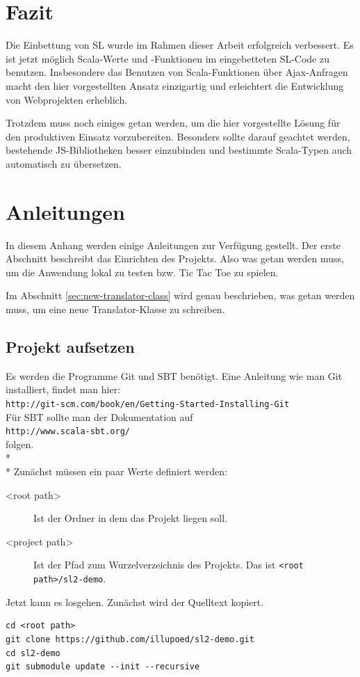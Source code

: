 \documentclass[12pt,bibtotoc]{scrreprt}
\begin{document}
\chapter{Fazit}
\label{chap:conclusion}

Die Einbettung von SL wurde im Rahmen dieser Arbeit erfolgreich verbessert. Es ist jetzt möglich Scala-Werte und -Funktionen im eingebetteten SL-Code zu benutzen. Insbesondere das Benutzen von Scala-Funktionen über Ajax-Anfragen macht den hier vorgestellten Ansatz einzigartig und erleichtert die Entwicklung von Webprojekten erheblich.

Trotzdem muss noch einiges getan werden, um die hier vorgestellte Lösung für den produktiven Einsatz vorzubereiten. Besonders sollte darauf geachtet werden, bestehende JS-Bibliotheken besser einzubinden und bestimmte Scala-Typen auch automatisch zu übersetzen.


\appendix

\chapter{Anleitungen}

In diesem Anhang werden einige Anleitungen zur Verfügung gestellt. Der erste Abschnitt beschreibt das Einrichten des Projekts. Also was getan werden muss, um die Anwendung lokal zu testen bzw. Tic Tac Toe zu spielen.

Im Abschnitt \ref{sec:new-translator-class} wird genau beschrieben, was getan werden muss, um eine neue Translator-Klasse zu schreiben. 

\section{Projekt aufsetzen}
\label{sec:setup-project}

Es werden die Programme Git und SBT benötigt. Eine Anleitung wie man Git installiert, findet man hier:\\\lstinline!http://git-scm.com/book/en/Getting-Started-Installing-Git!\\
Für SBT sollte man der Dokumentation auf\\
\lstinline!http://www.scala-sbt.org/!\\
folgen.\\*
\\*
Zunächst müssen ein paar Werte definiert werden:
\begin{description}
 \item[<root path>] Ist der Ordner in dem das Projekt liegen soll.
 \item[<project path>] Ist der Pfad zum Wurzelverzeichnis des Projekts. Das ist \lstinline!<root path>/sl2-demo!.
\end{description}
Jetzt kann es losgehen. Zunächst wird der Quelltext kopiert.
\begin{lstlisting}
cd <root path>
git clone https://github.com/illupoed/sl2-demo.git
cd sl2-demo
git submodule update --init --recursive
\end{lstlisting}
\end{document}
